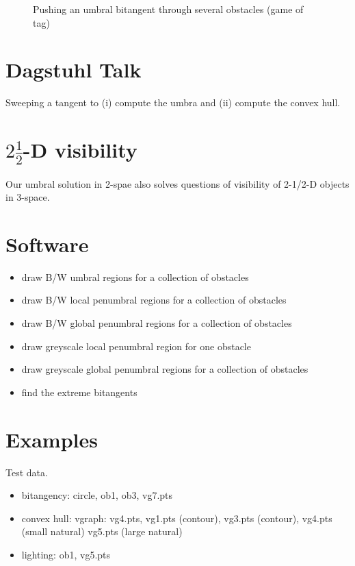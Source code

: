 \documentclass[12pt]{article}
\begin{document}
\begin{figure}
\centerline{}
\caption{Pushing an umbral bitangent through several obstacles (game of tag)}
\label{fig:globalumb3}
\end{figure}

\section{Dagstuhl Talk}

Sweeping a tangent to (i) compute the umbra and (ii) compute the convex hull.


\section{$2 \frac{1}{2}$-D visibility}

Our umbral solution in 2-spae also solves questions of visibility of 2-1/2-D objects in 3-space.

\section{Software}

\begin{itemize}
\item draw B/W umbral regions for a collection of obstacles
\item draw B/W local penumbral regions for a collection of obstacles
\item draw B/W global penumbral regions for a collection of obstacles 
\item draw greyscale local penumbral region for one obstacle
\item draw greyscale global penumbral regions for a collection of obstacles
\item find the extreme bitangents
\end{itemize}

\section{Examples}

Test data.
\begin{itemize}
\item bitangency: circle, ob1, ob3, vg7.pts
\item convex hull: vgraph: vg4.pts, vg1.pts (contour), vg3.pts (contour), vg4.pts (small natural)
	vg5.pts (large natural)
\item lighting: ob1, vg5.pts
\end{itemize}
\end{document}
